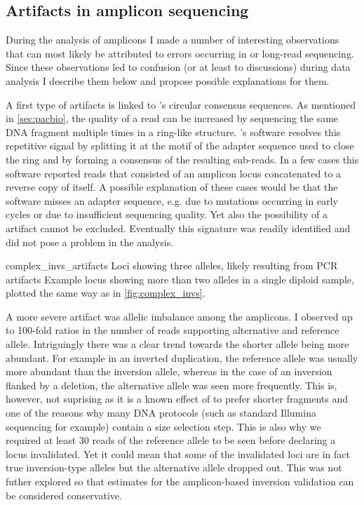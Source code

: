 \FloatBarrier
\subsection{Artifacts in amplicon sequencing}
\label{sec:complex_invs_artifacts}

During the analysis of amplicons I made a number of interesting observations
that can most likely be attributed to errors occurring in \pcr or long-read
sequencing. Since these observations led to confusion (or at least to
discussions) during data analysis I describe them below and propose possible
explanations for them.

A first type of artifacts is linked to \pacbio's circular consensus sequences.
As mentioned in \cref{sec:pacbio}, the quality of a \pacbio read can be
increased by sequencing the same DNA fragment multiple times in a ring-like
structure. \pacbio’s software resolves this repetitive signal by splitting it at
the motif of the adapter sequence used to close the ring and by forming a
consensus of the resulting sub-reads. In a few cases this software reported
reads that consisted of an amplicon locus concatenated to a reverse copy of
itself. A possible explanation of these cases would be that the software misses
an adapter sequence, e.g. due to mutations occurring in early \pcr cycles or due
to insufficient sequencing quality. Yet also the possibility of a \pcr artifact
cannot be excluded. Eventually this signature was readily identified and did not
pose a problem in the analysis.

    {complex_invs_artifacts}
    {Loci showing three alleles, likely resulting from PCR artifacts}
    {Example locus showing more than two alleles in a single diploid sample,
    plotted the same way as in \cref{fig:complex_invs}.}

A more severe artifact was allelic imbalance among the \pcr amplicons. I
observed up to 100-fold ratios in the number of reads supporting alternative and
reference allele. Intriguingly there was a clear trend towards the shorter
allele being more abundant. For example in an inverted duplication, the
reference allele was usually more abundant than the inversion allele, whereas in
the case of an inversion flanked by a deletion, the alternative allele was seen
more frequently. This is, however, not suprising as it is a known effect of \pcr
to prefer shorter fragments and one of the reasons why many DNA protocols (such
as standard Illumina sequencing for example) contain a size selection step. This
is also why we required at least 30 reads of the reference allele to be seen
before declaring a locus invalidated. Yet it could mean that some of the
invalidated loci are in fact true inversion-type alleles but the alternative
allele dropped out. This was not futher explored so that \fdr estimates for the
amplicon-based inversion validation can be considered conservative.

